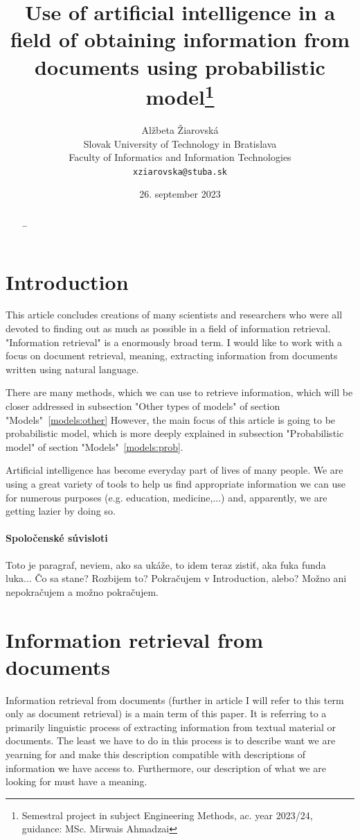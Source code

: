 \documentclass[10pt,twoside,english,a4paper]{article}
\title{Use of artificial intelligence in a field of obtaining information from documents using probabilistic model\thanks{Semestral project in subject Engineering Methods, ac. year 2023/24, guidance: MSc. Mirwais Ahmadzai}}
\author{Alžbeta Žiarovská\\[2pt]
	{\small Slovak University of Technology in Bratislava}\\
	{\small Faculty of Informatics and Information Technologies}\\
	{\small \texttt{xziarovska@stuba.sk}}
	}
\date{\small 26. september 2023}
\begin{document}
\maketitle
\newpage

\begin{abstract}
\ldots
\end{abstract}
\newpage

\section{Introduction}

This article concludes creations of many scientists and researchers who were all devoted to finding out as much as possible in a field of information retrieval. "Information retrieval" is a enormously broad term. I would like to work with a focus on document retrieval, meaning, extracting information from documents written using natural language. 

There are many methods, which we can use to retrieve information, which will be closer addressed in subsection "Other types of models" of section "Models"~\ref{models:other} However, the main focus of this article is going to be probabilistic model, which is more deeply explained in subsection "Probabilistic model" of section "Models"~\ref{models:prob}.

Artificial intelligence has become everyday part of lives of many people. We are using a great variety of tools to help us find appropriate information we can use for numerous purposes (e.g. education, medicine,...) and, apparently, we are getting lazier by doing so. \cite{ahmad23impact}
	

\paragraph{Spoločenské súvisloti}

Toto je paragraf, neviem, ako sa ukáže, to idem teraz zistiť, aka fuka funda luka... Čo sa stane? Rozbijem to?
Pokračujem v Introduction, alebo? Možno ani nepokračujem \cite{jones99info}a možno pokračujem.

\section{Information retrieval from documents}\label{ir}

Information retrieval from documents (further in article I will refer to this term only as document retrieval) is a main term of this paper. It is referring to a primarily linguistic process of extracting information from textual material or documents. The least we have to do in this process is to describe want we are yearning for and make this description compatible with descriptions of information we have access to. Furthermore, our description of what we are looking for must have a meaning. \cite{blair03info}
\end{document}
